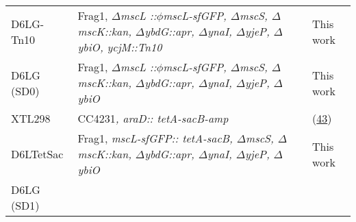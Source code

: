\begin{longtable}[]{@{}lll@{}}
\begin{minipage}[t]{0.16\columnwidth}
D6LG-Tn10\strut
\end{minipage}
&
\begin{minipage}[t]{0.63\columnwidth}\raggedright\strut
Frag1,
\emph{\(\Delta\)mscL
::\(\phi\)mscL-sfGFP,
\(\Delta\)mscS,
\(\Delta\)mscK::kan,
\(\Delta\)ybdG::apr,
\(\Delta\)ynaI,
\(\Delta\)yjeP,
\(\Delta\)ybiO,
ycjM::Tn10}\strut
\end{minipage}
&
\begin{minipage}[t]{0.13\columnwidth}\raggedright\strut
This
work\strut
\end{minipage}\tabularnewline
\begin{minipage}[t]{0.16\columnwidth}\raggedright\strut
D6LG
(SD0)\strut
\end{minipage}
&
\begin{minipage}[t]{0.63\columnwidth}\raggedright\strut
Frag1,
\emph{\(\Delta\)mscL
::\(\phi\)mscL-sfGFP,
\(\Delta\)mscS,
\(\Delta\)mscK::kan,
\(\Delta\)ybdG::apr,
\(\Delta\)ynaI,
\(\Delta\)yjeP,
\(\Delta\)ybiO}\strut
\end{minipage}
&
\begin{minipage}[t]{0.13\columnwidth}\raggedright\strut
This
work\strut
\end{minipage}\tabularnewline
\begin{minipage}[t]{0.16\columnwidth}\raggedright\strut
XTL298\strut
\end{minipage}
&
\begin{minipage}[t]{0.63\columnwidth}\raggedright\strut
CC4231\emph{,
araD::
tetA-sacB-amp}\strut
\end{minipage}
&
\begin{minipage}[t]{0.13\columnwidth}\raggedright\strut
(\protect\hyperlink{ref-li2013}{43})\strut
\end{minipage}\tabularnewline
\begin{minipage}[t]{0.16\columnwidth}\raggedright\strut
D6LTetSac\strut
\end{minipage}
&
\begin{minipage}[t]{0.63\columnwidth}\raggedright\strut
Frag1,
\emph{mscL-sfGFP::
tetA-sacB,
\(\Delta\)mscS,
\(\Delta\)mscK::kan,
\(\Delta\)ybdG::apr,
\(\Delta\)ynaI,
\(\Delta\)yjeP,
\(\Delta\)ybiO}\strut
\end{minipage}
&
\begin{minipage}[t]{0.13\columnwidth}\raggedright\strut
This
work\strut
\end{minipage}\tabularnewline
\begin{minipage}[t]{0.16\columnwidth}\raggedright\strut
D6LG
(SD1)\strut
\end{minipage}

\end{longtable}

